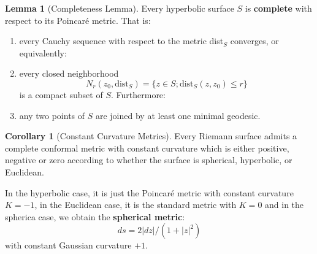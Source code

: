 \documentclass{article}
\theoremstyle{definition}
\newtheorem{lemma}{Lemma}
\newtheorem{corollary}{Corollary}
\begin{document}
    \begin{lemma}[Completeness Lemma]
        Every hyperbolic surface $S$ is \textbf{complete} with respect to its Poincaré metric. That is:
        \begin{enumerate}
            \item every Cauchy sequence with respect to the metric dist$_S$ converges, or equivalently:
            \item every closed neighborhood
                \[ N_r(z_0,\text{dist}_S) = \{z\in S;\text{dist}_S(z,z_0)\leq r\} \]
                is a compact subset of $S$. Furthermore:
            \item any two points of $S$ are joined by at least one minimal geodesic.
        \end{enumerate}
    \end{lemma}

    \begin{corollary}[Constant Curvature Metrics]
        Every Riemann surface admits a complete conformal metric with constant curvature which is either positive, negative or zero
        according to whether the surface is spherical, hyperbolic, or Euclidean.
    \end{corollary}

    In the hyperbolic case, it is just the Poincaré metric with constant curvature $K = -1$, in the Euclidean case, it is the standard
    metric with $K = 0$ and in the spherica case, we obtain the \textbf{spherical metric}:
    \[ ds = 2|dz|/(1+|z|^2) \]
    with constant Gaussian curvature $+1$.
    
\end{document}
